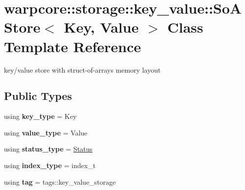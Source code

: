 \hypertarget{classwarpcore_1_1storage_1_1key__value_1_1SoAStore}{}\section{warpcore\+:\+:storage\+:\+:key\+\_\+value\+:\+:So\+A\+Store$<$ Key, Value $>$ Class Template Reference}
\label{classwarpcore_1_1storage_1_1key__value_1_1SoAStore}


key/value store with struct-\/of-\/arrays memory layout  


\subsection*{Public Types}
\begin{DoxyCompactItemize}
\item 
\mbox{\label{classwarpcore_1_1storage_1_1key__value_1_1SoAStore_aaf62f80f7231b706163763f0fd1e8e8e}} 
using {\bfseries key\+\_\+type} = Key
\item 
\mbox{\label{classwarpcore_1_1storage_1_1key__value_1_1SoAStore_aa7319b8f4847f18372fe9ce82f0e3173}} 
using {\bfseries value\+\_\+type} = Value
\item 
\mbox{\label{classwarpcore_1_1storage_1_1key__value_1_1SoAStore_a9896734c18911a23d8c3a7c4a1244fde}} 
using {\bfseries status\+\_\+type} = \hyperlink{classwarpcore_1_1Status}{Status}
\item 
\mbox{\label{classwarpcore_1_1storage_1_1key__value_1_1SoAStore_a218527a05fc4e0f11c96004726cedf7a}} 
using {\bfseries index\+\_\+type} = index\+\_\+t
\item 
\mbox{\label{classwarpcore_1_1storage_1_1key__value_1_1SoAStore_a7e9e973b44e42f9e8b9bb57587b4d33a}} 
using {\bfseries tag} = tags\+::key\+\_\+value\+\_\+storage
\end{DoxyCompactItemize}

